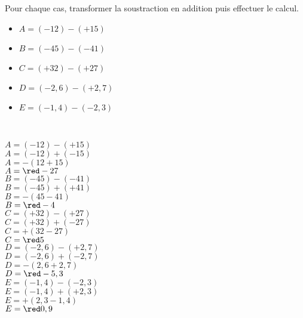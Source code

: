 \begin{exercice*}
   Pour chaque cas, transformer la soustraction en addition puis effectuer le calcul.
   \begin{itemize}
      \item[] $A =(-12)-(+15)$
      \item[] $B =(-45)-(-41)$
      \item[] $C =(+32)-(+27)$
      \item[] $D =(-2,6)-(+2,7)$
      \item[] $E =(-1,4)-(-2,3)$
   \end{itemize}
\end{exercice*}

\begin{corrige}
   \ \\ 
   \begin{multicols}{2}
      \begin{itemize}
         \def\item{}
         \item $A =(-12)-(+15)   $\\$A =(-12)+(-15)   $\\$A =-(12+15)  $\\$A =\red -27$  \\ \smallskip
         \item $B =(-45)-(-41)   $\\$B =(-45)+(+41)   $\\$B =-(45-41)  $\\$B =\red -4$   \\ \smallskip
         \item $C =(+32)-(+27)   $\\$C =(+32)+(-27)   $\\$C =+(32-27)  $\\$C =\red 5$    \\ \smallskip
         \columnbreak
         \item $D =(-2,6)-(+2,7) $\\$D =(-2,6)+(-2,7) $\\$D =-(2,6+2,7)$\\$D =\red -5,3$ \\ \smallskip
         \item $E =(-1,4)-(-2,3) $\\$E =(-1,4)+(+2,3) $\\$E =+(2,3-1,4)$\\$E =\red 0,9$  
      \end{itemize}
   \end{multicols}
\end{corrige}

